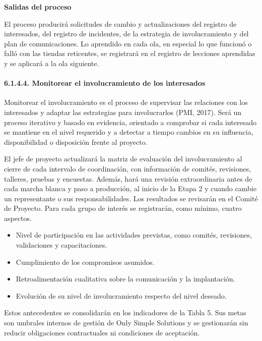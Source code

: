 \documentclass[11pt]{article}
\begin{document}
\textbf{Salidas del proceso}

El proceso producirá solicitudes de cambio y actualizaciones del
registro de interesados, del registro de incidentes, de la estrategia de
involucramiento y del plan de comunicaciones. Lo aprendido en cada ola,
en especial lo que funcionó o falló con las tiendas reticentes, se
registrará en el registro de lecciones aprendidas y se aplicará a la ola
siguiente.

\paragraph{6.1.4.4. Monitorear el involucramiento de los interesados}\label{6-1-4-4-monitorear-el-involucramiento-de-los-interesados}

Monitorear el involucramiento es el proceso de supervisar las relaciones con los interesados y adaptar las estrategias para involucrarlos (PMI, 2017). Será un proceso iterativo y basado en evidencia, orientado a comprobar si cada interesado se mantiene en el nivel requerido y a detectar a tiempo cambios en su influencia, disponibilidad o disposición frente al proyecto.

El jefe de proyecto actualizará la matriz de evaluación del
involucramiento al cierre de cada intervalo de coordinación, con
información de comités, revisiones, talleres, pruebas y encuestas.
Además, hará una revisión extraordinaria antes de cada marcha blanca y
paso a producción, al inicio de la Etapa 2 y cuando cambie un
representante o sus responsabilidades. Los resultados se revisarán en el
Comité de Proyecto. Para cada grupo de interés se registrarán, como
mínimo, cuatro aspectos.

\begin{itemize}
\item
  Nivel de participación en las actividades previstas, como comités,
  revisiones, validaciones y capacitaciones.
\item
  Cumplimiento de los compromisos asumidos.
\item
  Retroalimentación cualitativa sobre la comunicación y la implantación.
\item
  Evolución de su nivel de involucramiento respecto del nivel deseado.
\end{itemize}

Estos antecedentes se consolidarán en los indicadores de la Tabla 5.
Sus metas son umbrales internos de gestión de Only Simple Solutions y se
gestionarán sin reducir obligaciones contractuales ni condiciones de
aceptación.
\end{document}
